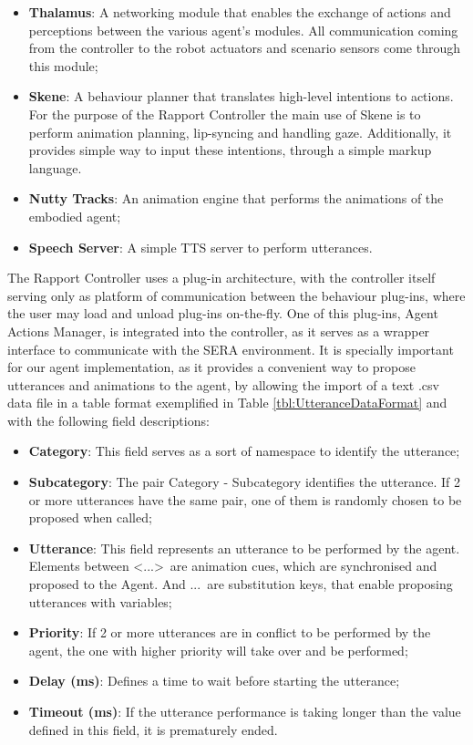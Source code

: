 \begin{itemize}
    \item \textbf{Thalamus}: A networking module that enables the exchange of actions and perceptions between the various agent's modules. All communication coming from the controller to the robot actuators and scenario sensors come through this module;
    \item \textbf{Skene}: A behaviour planner that translates high-level intentions to actions. For the purpose of the Rapport Controller the main use of Skene is to perform animation planning, lip-syncing and handling gaze. Additionally, it provides simple way to input these intentions, through a simple markup language.
    \item \textbf{Nutty Tracks}: An animation engine that performs the animations of the embodied agent;
    \item \textbf{Speech Server}: A simple \ac{TTS} server to perform utterances.
\end{itemize}
              
The Rapport Controller uses a plug-in architecture, with the controller itself serving only as platform of communication between the behaviour plug-ins, where the user may load and unload plug-ins on-the-fly. One of this plug-ins, Agent Actions Manager, is integrated into the controller, as it serves as a wrapper interface to communicate with the SERA environment. It is specially important for our agent implementation, as it provides a convenient way to propose utterances and animations to the agent, by allowing the import of a text .csv data file in a table format exemplified in Table \ref{tbl:UtteranceDataFormat} and with the following field descriptions:

\begin{itemize}
    \item \textbf{Category}: This field serves as a sort of namespace to identify the utterance;
    \item \textbf{Subcategory}: The pair Category - Subcategory identifies the utterance. If 2 or more utterances have the same pair, one of them is randomly chosen to be proposed when called;
    \item \textbf{Utterance}: This field represents an utterance to be performed by the agent. Elements between \textless...\textgreater\ are animation cues, which are synchronised and proposed to the Agent. And \textbar...\textbar\ are substitution keys, that enable proposing utterances with variables;
    \item \textbf{Priority}: If 2 or more utterances are in conflict to be performed by the agent, the one with higher priority will take over and be performed;
    \item \textbf{Delay (ms)}: Defines a time to wait before starting the utterance;
    \item \textbf{Timeout (ms)}: If the utterance performance is taking longer than the value defined in this field, it is prematurely ended. 
\end{itemize}

